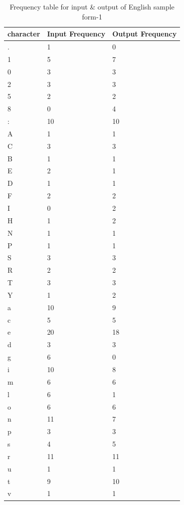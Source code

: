 \begin{table}[H]
\centering
\begin{tabular}{|p{2cm}|p{2cm}|p{2cm}|}
\hline
character & Input Frequency & Output Frequency \\
\hline
. & 1 & 0\\
\hline
1 & 5 & 7\\
\hline
0 & 3 & 3\\
\hline
2 & 3 & 3\\
\hline
5 & 2 & 2\\
\hline
8 & 0 & 4\\
\hline
: & 10 & 10\\
\hline
A & 1 & 1\\
\hline
C & 3 & 3\\
\hline
B & 1 & 1\\
\hline
E & 2 & 1\\
\hline
D & 1 & 1\\
\hline
F & 2 & 2\\
\hline
I & 0 & 2\\
\hline
H & 1 & 2\\
\hline
N & 1 & 1\\
\hline
P & 1 & 1\\
\hline
S & 3 & 3\\
\hline
R & 2 & 2\\
\hline
T & 3 & 3\\
\hline
Y & 1 & 2\\
\hline
a & 10 & 9\\
\hline
c & 5 & 5\\
\hline
e & 20 & 18\\
\hline
d & 3 & 3\\
\hline
g & 6 & 0\\
\hline
i & 10 & 8\\
\hline
m & 6 & 6\\
\hline
l & 6 & 1\\
\hline
o & 6 & 6\\
\hline
n & 11 & 7\\
\hline
p & 3 & 3\\
\hline
s & 4 & 5\\
\hline
r & 11 & 11\\
\hline
u & 1 & 1\\
\hline
t & 9 & 10\\
\hline
v & 1 & 1\\
\hline
\end{tabular}
\caption {Frequency table for input \& output of English sample form-1}
\label {tab:Table1}
\end{table}

